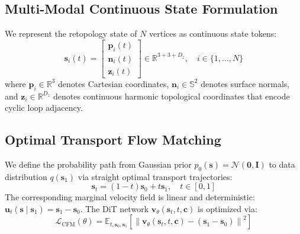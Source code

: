 \documentclass[acmtog,nonacm]{acmart}
\begin{document}
\subsection{Multi-Modal Continuous State Formulation}
We represent the retopology state of $N$ vertices as continuous state tokens:
\begin{equation}
\mathbf{s}_i(t) = \begin{bmatrix} \mathbf{p}_i(t) \\ \mathbf{n}_i(t) \\ \mathbf{z}_i(t) \end{bmatrix} \in \mathbb{R}^{3 + 3 + D_z}, \quad i \in \{1, \dots, N\}
\end{equation}
where $\mathbf{p}_i \in \mathbb{R}^3$ denotes Cartesian coordinates, $\mathbf{n}_i \in \mathbb{S}^2$ denotes surface normals, and $\mathbf{z}_i \in \mathbb{R}^{D_z}$ denotes continuous harmonic topological coordinates that encode cyclic loop adjacency.

\subsection{Optimal Transport Flow Matching}
We define the probability path from Gaussian prior $p_0(\mathbf{s}) = \mathcal{N}(\mathbf{0}, \mathbf{I})$ to data distribution $q(\mathbf{s}_1)$ via straight optimal transport trajectories:
\begin{equation}
\mathbf{s}_t = (1 - t)\mathbf{s}_0 + t\mathbf{s}_1, \quad t \in [0, 1]
\end{equation}
The corresponding marginal velocity field is linear and deterministic: $\mathbf{u}_t(\mathbf{s} \mid \mathbf{s}_1) = \mathbf{s}_1 - \mathbf{s}_0$. The DiT network $\mathbf{v}_\theta(\mathbf{s}_t, t, \mathbf{c})$ is optimized via:
\begin{equation}
\mathcal{L}_{\text{CFM}}(\theta) = \mathbb{E}_{t, \mathbf{s}_0, \mathbf{s}_1} \left[ \left\| \mathbf{v}_\theta(\mathbf{s}_t, t, \mathbf{c}) - (\mathbf{s}_1 - \mathbf{s}_0) \right\|^2 \right]
\end{equation}
\end{document}
